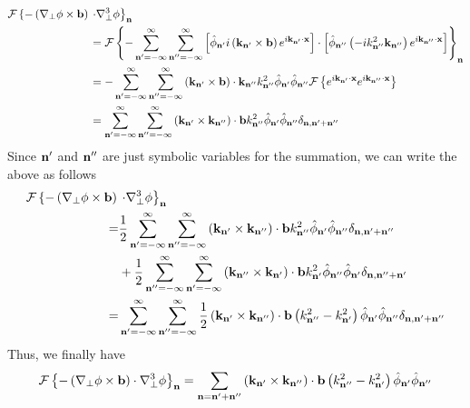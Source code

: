 \documentclass[11pt]{article}
\begin{document}
\begin{align}
    \mathcal{F} \left \{ - \left (\nabla_\perp \phi \times \mathbf{b} \right ) \right . & \left . \cdot \nabla^3_\perp \phi \right \}_{\mathbf{n}} \nonumber \\
    &= \mathcal{F} \left \{ -\sum_{\mathbf{n}'=-\infty}^\infty \sum_{\mathbf{n}''=-\infty}^\infty \left [ \hat{\phi}_{\mathbf{n}'} i \left ( \mathbf{k}_{\mathbf{n}'} \times \mathbf{b} \right ) e^{i \mathbf{k}_{\mathbf{n}'} \cdot \mathbf{x}} \right ] \cdot \left [ \hat{\phi}_{\mathbf{n}''} \left ( -i k^2_{\mathbf{n}''} \mathbf{k}_{\mathbf{n}''} \right ) e^{i \mathbf{k}_{\mathbf{n}''} \cdot \mathbf{x}} \right ] \right \}_{\mathbf{n}} \nonumber \\
    &= -\sum_{\mathbf{n}'=-\infty}^\infty \sum_{\mathbf{n}''=-\infty}^\infty \left ( \mathbf{k}_{\mathbf{n}'} \times \mathbf{b} \right ) \cdot \mathbf{k}_{\mathbf{n}''} k^2_{\mathbf{n}''} \hat{\phi}_{\mathbf{n}'} \hat{\phi}_{\mathbf{n}''} \mathcal{F} \left \{ e^{i \mathbf{k}_{\mathbf{n}'} \cdot \mathbf{x}} e^{i \mathbf{k}_{\mathbf{n}''} \cdot \mathbf{x}} \right \} \nonumber \\
    &= \sum_{\mathbf{n}'=-\infty}^\infty \sum_{\mathbf{n}''=-\infty}^\infty \left ( \mathbf{k}_{\mathbf{n}'} \times \mathbf{k}_{\mathbf{n}''} \right ) \cdot \mathbf{b} k^2_{\mathbf{n}''} \hat{\phi}_{\mathbf{n}'} \hat{\phi}_{\mathbf{n}''} \delta_{\mathbf{n}, \mathbf{n}' + \mathbf{n}''}
\end{align}
Since $\mathbf{n}'$ and $\mathbf{n}''$ are just symbolic variables for the summation, we can write the above as follows
\begin{align}
    \mathcal{F} \left \{ - \left (\nabla_\perp \phi \times \mathbf{b} \right ) \right . & \left . \cdot \nabla^3_\perp \phi \right \}_{\mathbf{n}} \nonumber \\
    =& \frac{1}{2} \sum_{\mathbf{n}'=-\infty}^\infty \sum_{\mathbf{n}''=-\infty}^\infty \left ( \mathbf{k}_{\mathbf{n}'} \times \mathbf{k}_{\mathbf{n}''} \right ) \cdot \mathbf{b} k^2_{\mathbf{n}''} \hat{\phi}_{\mathbf{n}'} \hat{\phi}_{\mathbf{n}''} \delta_{\mathbf{n}, \mathbf{n}' + \mathbf{n}''} \nonumber \\
    &+ \frac{1}{2} \sum_{\mathbf{n}''=-\infty}^\infty \sum_{\mathbf{n}'=-\infty}^\infty \left ( \mathbf{k}_{\mathbf{n}''} \times \mathbf{k}_{\mathbf{n}'} \right ) \cdot \mathbf{b} k^2_{\mathbf{n}'} \hat{\phi}_{\mathbf{n}''} \hat{\phi}_{\mathbf{n}'} \delta_{\mathbf{n}, \mathbf{n}'' + \mathbf{n}'} \nonumber \\
    =& \sum_{\mathbf{n}'=-\infty}^\infty \sum_{\mathbf{n}''=-\infty}^\infty \frac{1}{2} \left ( \mathbf{k}_{\mathbf{n}'} \times \mathbf{k}_{\mathbf{n}''} \right ) \cdot \mathbf{b} \left ( k^2_{\mathbf{n}''} - k^2_{\mathbf{n}'} \right ) \hat{\phi}_{\mathbf{n}'} \hat{\phi}_{\mathbf{n}''} \delta_{\mathbf{n}, \mathbf{n}' + \mathbf{n}''}
\end{align}
Thus, we finally have
\begin{equation}
    \mathcal{F} \left \{ - \left (\nabla_\perp \phi \times \mathbf{b} \right ) \cdot \nabla^3_\perp \phi \right \}_{\mathbf{n}} = \sum_{\mathbf{n} = \mathbf{n}' + \mathbf{n}''} \left ( \mathbf{k}_{\mathbf{n}'} \times \mathbf{k}_{\mathbf{n}''} \right ) \cdot \mathbf{b} \left ( k^2_{\mathbf{n}''} - k^2_{\mathbf{n}'} \right ) \hat{\phi}_{\mathbf{n}'} \hat{\phi}_{\mathbf{n}''}
\end{equation}
\end{document}

